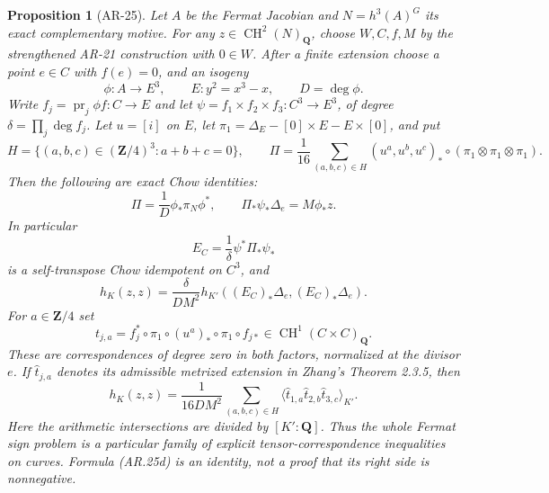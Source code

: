 \documentclass[11pt,a4paper]{article}
\newtheorem{proposition}[theorem]{Proposition}
\begin{document}
\begin{proposition}[AR-25]
Let $A$ be the Fermat Jacobian and $N=h^3(A)^G$ its exact
complementary motive.  For any $z\in\operatorname{CH}^2(N)_\mathbf Q$,
choose $W,C,f,M$ by the strengthened AR-21 construction with
$0\in W$.  After a finite extension choose a point $e\in C$ with
$f(e)=0$, and an isogeny
\[
 \phi:A\longrightarrow E^3,\qquad E:y^2=x^3-x,
 \qquad D=\deg\phi.
\]
Write $f_j=\operatorname{pr}_j\phi f:C\to E$ and let
$\psi=f_1\times f_2\times f_3:C^3\to E^3$, of degree
$\delta=\prod_j\deg f_j$.  Let $u=[i]$ on $E$, let
$\pi_1=\Delta_E-[0]\times E-E\times[0]$, and put
\[
 H=\{(a,b,c)\in(\mathbf Z/4)^3:a+b+c=0\},\qquad
 \Pi=\frac1{16}\sum_{(a,b,c)\in H}
    (u^a,u^b,u^c)_*\circ(\pi_1\otimes\pi_1\otimes\pi_1).
                                                               \tag{AR.25a}
\]
Then the following are exact Chow identities:
\[
 \Pi=\frac1D\phi_*\pi_N\phi^*,\qquad
 \Pi_*\psi_*\Delta_e=M\phi_*z.                         \tag{AR.25b}
\]
In particular
\[
 E_C=\frac1\delta\psi^*\Pi_*\psi_*
\]
is a self-transpose Chow idempotent on $C^3$, and
\[
 h_K(z,z)=\frac{\delta}{D M^2}
          h_{K'}((E_C)_*\Delta_e,(E_C)_*\Delta_e).       \tag{AR.25c}
\]
For $a\in\mathbf Z/4$ set
\[
 t_{j,a}=f_j^*\circ\pi_1\circ(u^a)_*\circ\pi_1\circ f_{j*}
       \in\operatorname{CH}^1(C\times C)_\mathbf Q.
\]
These are correspondences of degree zero in both factors,
normalized at the divisor $e$.  If $\widehat t_{j,a}$ denotes its
admissible metrized extension in Zhang's Theorem 2.3.5, then
\[
 h_K(z,z)=\frac1{16D M^2}
    \sum_{(a,b,c)\in H}
       \bigl\langle\widehat t_{1,a}\widehat t_{2,b}
                                  \widehat t_{3,c}\bigr\rangle_{K'}.
                                                               \tag{AR.25d}
\]
Here the arithmetic intersections are divided by $[K':\mathbf Q]$.
Thus the whole Fermat sign problem is a particular family of
explicit tensor-correspondence inequalities on curves.  Formula
(AR.25d) is an identity, not a proof that its right side is
nonnegative.
\end{proposition}
\end{document}
